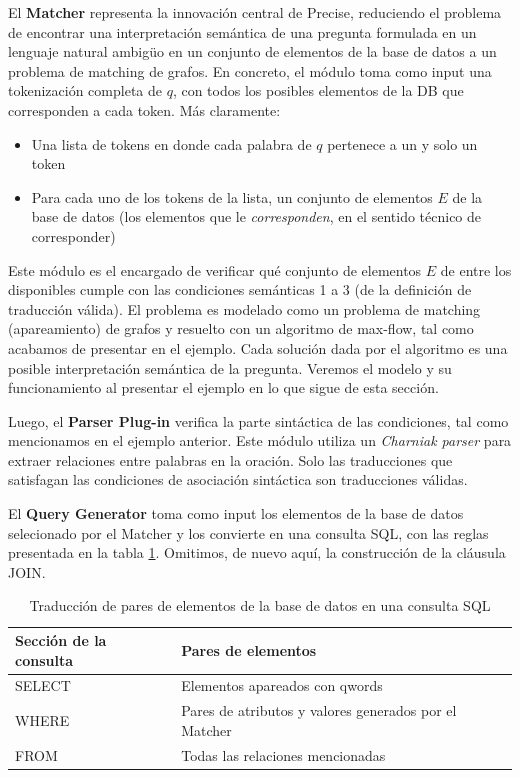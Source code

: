 El \textbf{Matcher} representa la innovación central de Precise, reduciendo el problema de encontrar una interpretación semántica de una pregunta formulada en un lenguaje natural ambigüo en un conjunto de elementos de la base de datos a un problema de matching de grafos. En concreto, el módulo toma como input una tokenización completa de $q$, con todos los posibles elementos de la DB que corresponden a cada token. Más claramente:
\begin{itemize}
  \item Una lista de tokens en donde cada palabra de $q$ pertenece a un y solo un token
  \item Para cada uno de los tokens de la lista, un conjunto de elementos $E$ de la base de datos (los elementos que le \textit{corresponden}, en el sentido técnico de corresponder)
\end{itemize}

Este módulo es el encargado de verificar qué conjunto de elementos $E$ de entre los disponibles cumple con las condiciones semánticas 1 a 3 (de la definición de traducción válida). El problema es modelado como un problema de matching (apareamiento) de grafos y resuelto con un algoritmo de max-flow, tal como acabamos de presentar en el ejemplo. Cada solución dada por el algoritmo es una posible interpretación semántica de la pregunta. Veremos el modelo y su funcionamiento al presentar el ejemplo en lo que sigue de esta sección.

Luego, el \textbf{Parser Plug-in} verifica la parte sintáctica de las condiciones, tal como mencionamos en el ejemplo anterior. Este módulo utiliza un \textit{Charniak parser} para extraer relaciones entre palabras en la oración. Solo las traducciones que satisfagan las condiciones de asociación sintáctica son traducciones válidas.

El \textbf{Query Generator} toma como input los elementos de la base de datos selecionado por el Matcher y los convierte en una consulta SQL, con las reglas presentada en la tabla \ref{table:db-to-sql}. Omitimos, de nuevo aquí, la construcción de la cláusula JOIN.


\begin{center}
\begin{table}[h]
\centering
\begin{tabular}{| l |  p{12cm} |}
\hline
Sección de la consulta & Pares de elementos \\ \hline
SELECT &  Elementos apareados con qwords \\ \hline
WHERE & Pares de atributos y valores generados por el Matcher\\ \hline
FROM & Todas las relaciones mencionadas \\ \hline
\end{tabular}
\caption{Traducción de pares de elementos de la base de datos en una consulta SQL}
\label{table:db-to-sql}
\end{table}
\end{center}

